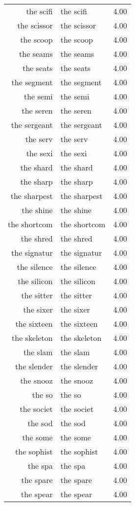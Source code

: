 \begin{table}[ht]
\begin{tabular}{rlr}
  the scifi & the scifi & 4.00 \\ 
  the scissor & the scissor & 4.00 \\ 
  the scoop & the scoop & 4.00 \\ 
  the seams & the seams & 4.00 \\ 
  the seats & the seats & 4.00 \\ 
  the segment & the segment & 4.00 \\ 
  the semi & the semi & 4.00 \\ 
  the seren & the seren & 4.00 \\ 
  the sergeant & the sergeant & 4.00 \\ 
  the serv & the serv & 4.00 \\ 
  the sexi & the sexi & 4.00 \\ 
  the shard & the shard & 4.00 \\ 
  the sharp & the sharp & 4.00 \\ 
  the sharpest & the sharpest & 4.00 \\ 
  the shine & the shine & 4.00 \\ 
  the shortcom & the shortcom & 4.00 \\ 
  the shred & the shred & 4.00 \\ 
  the signatur & the signatur & 4.00 \\ 
  the silence & the silence & 4.00 \\ 
  the silicon & the silicon & 4.00 \\ 
  the sitter & the sitter & 4.00 \\ 
  the sixer & the sixer & 4.00 \\ 
  the sixteen & the sixteen & 4.00 \\ 
  the skeleton & the skeleton & 4.00 \\ 
  the slam & the slam & 4.00 \\ 
  the slender & the slender & 4.00 \\ 
  the snooz & the snooz & 4.00 \\ 
  the so & the so & 4.00 \\ 
  the societ & the societ & 4.00 \\ 
  the sod & the sod & 4.00 \\ 
  the some & the some & 4.00 \\ 
  the sophist & the sophist & 4.00 \\ 
  the spa & the spa & 4.00 \\ 
  the spare & the spare & 4.00 \\ 
  the spear & the spear & 4.00 \\ 

\end{tabular}
\end{table}
